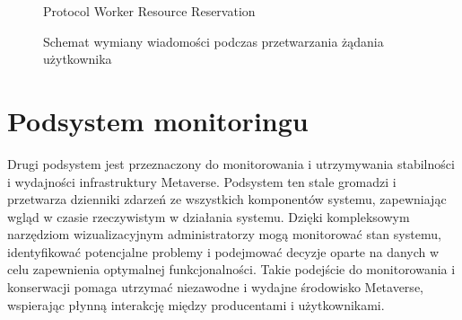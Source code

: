 \begin{figure}[h!]
    \centering
    \begin{msc}[
        title position=center,
        msc keyword=,
        draw frame=none,
        instance distance=2.5cm,
        left environment distance=0.5cm,
        right environment distance=0.5cm,
        label distance=0.3cm,
        title distance=0.5cm
        ]{Protocol Worker Resource Reservation}
            
            \footnotesize
            \nextlevel
            \nextlevel
            \nextlevel
            \nextlevel
            \nextlevel
            \nextlevel
            \nextlevel
            \nextlevel
            \nextlevel
            \nextlevel
            \nextlevel
            \nextlevel
            \nextlevel
            \nextlevel
            \nextlevel
            \nextlevel
            \nextlevel
            \nextlevel
            \nextlevel
            \nextlevel
            \nextlevel
            \nextlevel
            \nextlevel
            \nextlevel
            \nextlevel
        \end{msc}
    \caption{ Schemat wymiany wiadomości podczas przetwarzania żądania użytkownika}
    \label{wymianaWiadomosciWSystemie}
\end{figure}

\section{Podsystem monitoringu}

Drugi podsystem jest przeznaczony do monitorowania i utrzymywania stabilności i wydajności infrastruktury Metaverse. Podsystem ten stale gromadzi i przetwarza dzienniki zdarzeń ze wszystkich komponentów systemu, zapewniając wgląd w czasie rzeczywistym w działania systemu. Dzięki kompleksowym narzędziom wizualizacyjnym administratorzy mogą monitorować stan systemu, identyfikować potencjalne problemy i podejmować decyzje oparte na danych w celu zapewnienia optymalnej funkcjonalności. Takie podejście do monitorowania i konserwacji pomaga utrzymać niezawodne i wydajne środowisko Metaverse, wspierając płynną interakcję między producentami i użytkownikami.
